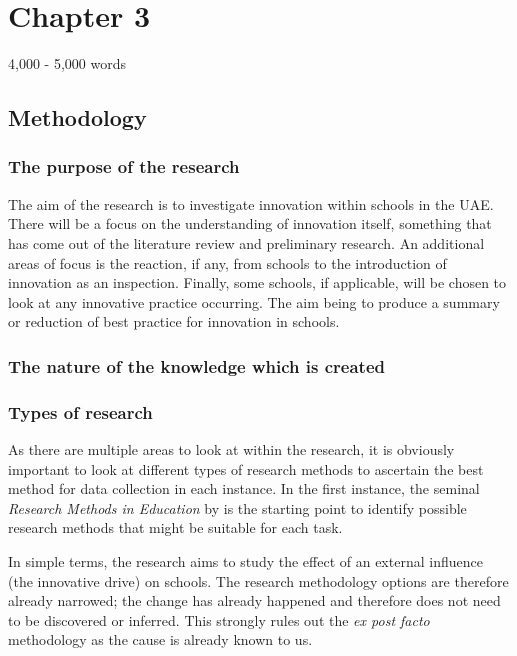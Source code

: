\section{Chapter 3}
4,000 - 5,000 words
\subsection{Methodology}

\subsubsection{The purpose of the research}
The aim of the research is to investigate innovation within schools in the UAE. There will be a focus on the understanding of innovation itself, something that has come out of the literature review and preliminary research. An additional areas of focus is the reaction, if any, from schools to the introduction of innovation as an inspection. Finally, some schools, if applicable, will be chosen to look at any innovative practice occurring. The aim being to produce a summary or reduction of best practice for innovation in schools.

\subsubsection{The nature of the knowledge which is created}

\subsubsection{Types of research}

As there are multiple areas to look at within the research, it is obviously important to look at different types of research methods to ascertain the best method for data collection in each instance. In the first instance, the seminal \textit{Research Methods in Education} by \citet{Cohen2005} is the starting point to identify possible research methods that might be suitable for each task.

In simple terms, the research aims to study the effect of an external influence (the innovative drive) on schools. The research methodology options are therefore already narrowed; the change has already happened and therefore does not need to be discovered or inferred. This strongly rules out the \textit{ex post facto} methodology as the cause is already known to us.

